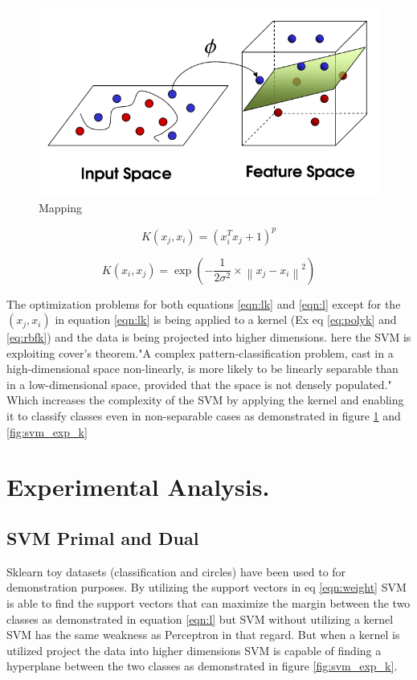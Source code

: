 \documentclass[10pt,onecolumn,letterpaper]{article}
\begin{document}
\begin{figure}[h!]
  \includegraphics[width=\linewidth]{kernel.png}
  \caption{Mapping}
  \label{fig:kernel}
\end{figure}


\begin{equation}
K\left( x_{j},x_{i}\right) =\left( x_{i}^{T}x_{j}+1\right) ^{p}
\label{eq:polyk}
\end{equation}


\begin{equation}
K\left( x_{i},x_{j}\right) =\exp \left( -\dfrac{1}{2\sigma ^{2}}\times \left\| x_{j}-x_{i}\right\| ^{2}\right) 
\label{eq:rbfk}
\end{equation}

The optimization problems for both equations \ref{eqn:lk} and \ref{eqn:l} except for the $( x_{j},x_{i})$ in equation \ref{eqn:lk} is being applied to a kernel (Ex eq \ref{eq:polyk} and \ref{eq:rbfk}) and the data is being projected into higher dimensions. here the SVM is exploiting cover's theorem."A complex pattern-classification problem, cast in a high-dimensional space non-linearly, is more likely to be linearly separable than in a low-dimensional space, provided that the space is not densely populated." \cite{Cover1965} Which increases the complexity of the SVM by applying the kernel and enabling it to classify classes even in non-separable cases as demonstrated in figure \ref{fig:kernel} and \ref{fig:svm_exp_k}

\section{Experimental Analysis.}

\subsection{SVM Primal and Dual}
Sklearn toy datasets (classification and circles) have been used to for demonstration purposes. By utilizing the support vectors in eq \ref{eqn:weight} SVM is able to find the support vectors that can maximize the margin between the two classes as demonstrated in equation \ref{eqn:l} but SVM without utilizing a kernel SVM has the same weakness as Perceptron \cite{Rosenblatt1958} \cite{Minsky1969} \cite{Murphy2017} in that regard. But when a kernel is utilized project the data into higher dimensions SVM is capable of finding a hyperplane between the two classes as demonstrated in figure \ref{fig:svm_exp_k}.
\end{document}
